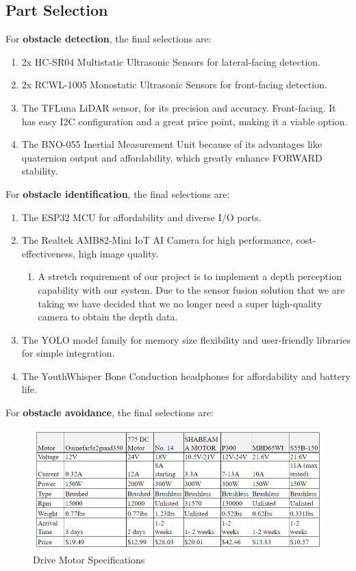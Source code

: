 \subsection{Part Selection}
\noindent For \textbf{obstacle detection}, the final selections are:
\begin{enumerate}
	\item 2x HC-SR04 Multistatic Ultrasonic Sensors for lateral-facing detection.
	\item 2x RCWL-1005 Monostatic Ultrasonic Sensors for front-facing detection.
	\item The TFLuna LiDAR sensor, for its precision and accuracy. Front-facing. It has easy I2C configuration and a great price point, making it a viable option.
	\item The BNO-055 Inertial Measurement Unit because of its advantages like quaternion output and affordability, which greatly enhance FORWARD stability.
\end{enumerate}

\noindent For \textbf{obstacle identification}, the final selections are:
\begin{enumerate}
	\item The ESP32 MCU for affordability and diverse I/O ports. 
	\item The Realtek AMB82-Mini IoT AI Camera for high performance, cost-effectiveness, high image quality.
	\begin{enumerate}
		\item A stretch requirement of our project is to implement a depth perception capability with our system. Due to the sensor fusion solution that we are taking we have decided that we no longer need a super high-quality camera to obtain the depth data.
	\end{enumerate}
	\item The YOLO model family for memory size flexibility and user-friendly libraries for simple integration.
	\item The YouthWhisper Bone Conduction headphones for affordability and battery life.
\end{enumerate}


\noindent For \textbf{obstacle avoidance}, the final selections are:
\begin{figure}[H]
	\centering
	\includegraphics[width=1\textwidth]{./Images/drive_motors.png}
	\caption{\label{fig:drive_motors}Drive Motor Specifications}
\end{figure}


